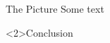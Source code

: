 \documentclass{beamer}
\begin{document}
  \begin{frame}{The Picture}
    Some text
    \begin{center}
      
    \end{center}
  \end{frame}

  \begin{frame}<2>{Conclusion}
    \centering
    
  \end{frame}
\end{document}
